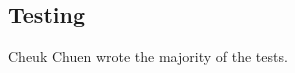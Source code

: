 \documentclass{article}
\begin{document}
\subsection*{Testing}
Cheuk Chuen wrote the majority of the tests.


\end{document}
